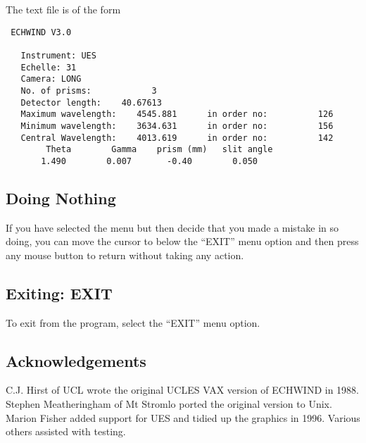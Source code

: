 \documentclass[11pt]{article}
\begin{document}
The text file is of the form
\begin{verbatim}
 ECHWIND V3.0

   Instrument: UES
   Echelle: 31
   Camera: LONG
   No. of prisms:            3
   Detector length:    40.67613
   Maximum wavelength:    4545.881      in order no:          126
   Minimum wavelength:    3634.631      in order no:          156
   Central Wavelength:    4013.619      in order no:          142
        Theta        Gamma    prism (mm)   slit angle
       1.490        0.007       -0.40        0.050
\end{verbatim}

\subsection{Doing Nothing}

If you have selected the menu but then decide that you made a mistake in so
doing, you can move the cursor to below the ``EXIT'' menu option and then
press any mouse button to return without taking any action.

\subsection{Exiting: EXIT}

To exit from the program, select the ``EXIT'' menu option.

\subsection{Acknowledgements}

C.J. Hirst of UCL wrote the original UCLES VAX version of ECHWIND in 1988.
Stephen Meatheringham of Mt Stromlo ported the original version to Unix.
Marion Fisher added support for UES and tidied up the graphics in 1996.
Various others assisted with testing.
\end{document}
